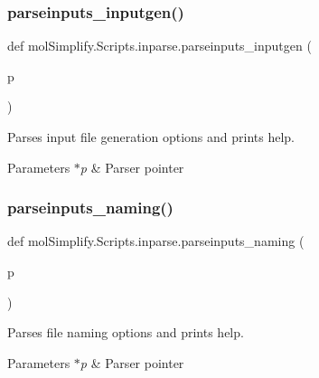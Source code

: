 \subsubsection{\texorpdfstring{parseinputs\+\_\+inputgen()}{parseinputs\_inputgen()}}
{\footnotesize\ttfamily def mol\+Simplify.\+Scripts.\+inparse.\+parseinputs\+\_\+inputgen (\begin{DoxyParamCaption}\item[{}]{p }\end{DoxyParamCaption})}



Parses input file generation options and prints help. 


\begin{DoxyParams}{Parameters}
{\em $\ast$p} & Parser pointer \\
\hline
\end{DoxyParams}
\mbox{\label{namespacemolSimplify_1_1Scripts_1_1inparse_ac12552e07d9ca0394ea31de10ebf3e8e}} 
\subsubsection{\texorpdfstring{parseinputs\+\_\+naming()}{parseinputs\_naming()}}
{\footnotesize\ttfamily def mol\+Simplify.\+Scripts.\+inparse.\+parseinputs\+\_\+naming (\begin{DoxyParamCaption}\item[{}]{p }\end{DoxyParamCaption})}



Parses file naming options and prints help. 


\begin{DoxyParams}{Parameters}
{\em $\ast$p} & Parser pointer \\
\hline
\end{DoxyParams}
\mbox{\label{namespacemolSimplify_1_1Scripts_1_1inparse_a31f40603d68af1a3ffd07cdb38217c6a}} 
